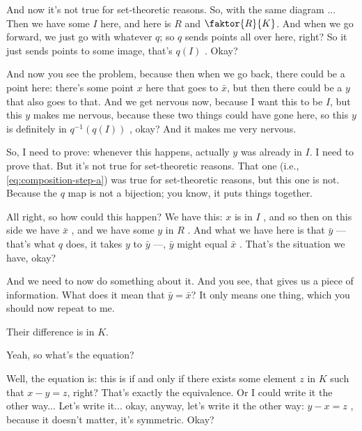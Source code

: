 \begin{proofWrapper}
\begin{speech}[00:32:06 - 00:34:06]
And now it's not true for set-theoretic reasons. So, with the same diagram ... Then we have some $I$ here, and here is $R$ and $\faktor{R}{K}$. And when we go forward, we just go with whatever $q$; so $q$ sends points all over here, right? So it just sends points to some image, that's $q(I)$ . Okay?

And now you see the problem, because then when we go back, there could be a point here: there's some point $x$ here that goes to $\bar{x}$, but then there could be a $y$ that also goes to that. And we get nervous now, because I want this to be $I$, but this $y$ makes me nervous, because these two things could have gone here, so this $y$ is definitely in $q^{-1}(q(I))$ , okay? And it makes me very nervous.

So, I need to prove: whenever this happens, actually $y$ was already in $I$. I need to prove that. But it's not true for set-theoretic reasons. That one (i.e., \cref{eq:composition-step-a}) was true for set-theoretic reasons, but this one is not. Because the $q$ map is not a bijection; you know, it puts things together.
\end{speech}

\begin{speech}[00:34:06 - 00:34:45]
All right, so how could this happen? We have this: $x$ is in $I$ , and so then on this side we have $\bar{x}$ , and we have some $y$ in $R$ . And what we have here is that $\bar{y}$ --- that's what $q$ does, it takes $y$ to $\bar{y}$ ---, $\bar{y}$ might equal $\bar{x}$ . That's the situation we have, okay?

And we need to now do something about it. And you see, that gives us a piece of information. What does it mean that $\bar{y} = \bar{x}$? It only means one thing, which you should now repeat to me.
\end{speech}

\begin{student}
Their difference is in $K$.
\end{student}

\begin{speech}[00:34:49 - 00:36:36]
Yeah, so what's the equation? 

Well, the equation is: this is if and only if there exists some element $z$ in $K$ such that $x - y = z$, right?  That's exactly the equivalence. Or I could write it the other way... Let's write it... okay, anyway, let's write it the other way: $y - x = z$ , because it doesn't matter, it's symmetric. Okay?


\end{speech}
\end{proofWrapper}
